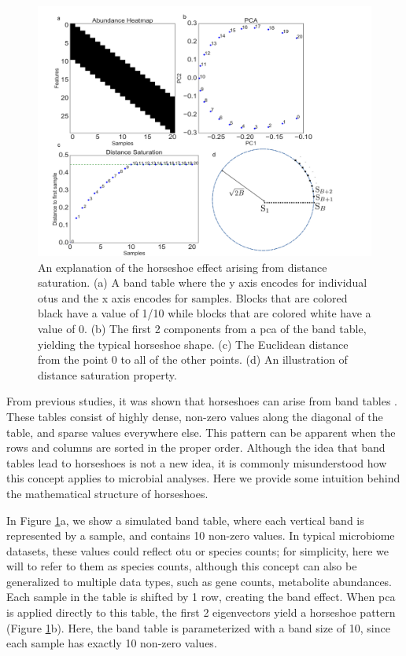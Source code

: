 \begin{figure}[H]
        \centering
        \includegraphics[width=1.1\textwidth]{ch2/Figure1.pdf}
        \caption[An explanation of the horseshoe effect arising from distance saturation.]
        {An explanation of the horseshoe effect arising from distance saturation. (a) A band table where the y axis encodes for individual \gls{otu}s and the x axis encodes for samples.  Blocks that are colored black have a value of 1/10 while blocks that are colored white have a value of 0.  (b) The first 2 components from a \gls{pca} of the band table, yielding the typical horseshoe shape.  (c) The Euclidean distance from the point 0 to all of the other points.  (d) An illustration of distance saturation property.}
        \label{figb1}
\end{figure}
From previous studies, it was shown that horseshoes can arise from band tables \cite{horseshoe_kernel, guttman_effect}.  These tables consist of highly dense, non-zero values along the diagonal of the table, and sparse values everywhere else.  This pattern can be apparent when the rows and columns are sorted in the proper order. Although the idea that band tables lead to horseshoes is not a new idea, it is commonly misunderstood how this concept applies to microbial analyses.  Here we provide some intuition behind the mathematical structure of horseshoes.\par
In Figure \ref{figb1}a, we show a simulated band table, where each vertical band is represented by a sample, and contains 10 non-zero values.  In typical microbiome datasets, these values could reflect \gls{otu} or species counts; for simplicity, here we will to refer to them as species counts, although this concept can also be generalized to multiple data types, such as gene counts, metabolite abundances.  Each sample in the table is shifted by 1 row, creating the band effect.  When \gls{pca} is applied directly to this table, the first 2 eigenvectors yield a horseshoe pattern (Figure \ref{figb1}b).  Here, the band table is parameterized with a band size of 10, since each sample has exactly 10 non-zero values.  \par
